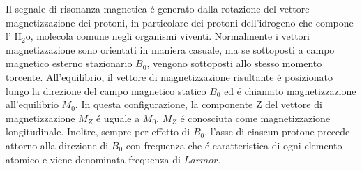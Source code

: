 \documentclass[a4paper,12pt]{report}
\begin{document}
 Il segnale di risonanza magnetica \'e generato dalla rotazione del vettore magnetizzazione dei protoni, in particolare dei protoni dell'idrogeno che compone l' $\mbox{H}_2\mbox{o}$, molecola comune negli organismi viventi. 
 Normalmente i vettori magnetizzazione sono orientati in maniera casuale, ma se sottoposti a campo magnetico esterno stazionario $B_0$, vengono sottoposti allo stesso momento torcente.
 All'equilibrio, il vettore di magnetizzazione risultante \'e posizionato lungo la direzione del campo magnetico statico $B_0$ ed \'e chiamato magnetizzazione all'equilibrio $M_0$. 
 In questa configurazione, la componente Z del vettore di magnetizzazione $M_Z$ \'e uguale a $M_0$. 
 $M_Z$ \'e conosciuta come magnetizzazione longitudinale. 
 Inoltre, sempre per effetto di $B_0$, l'asse di ciascun protone precede attorno alla direzione di $B_0$ con frequenza che \'e caratteristica di ogni elemento atomico e viene denominata frequenza di $Larmor$.
 
\end{document}
